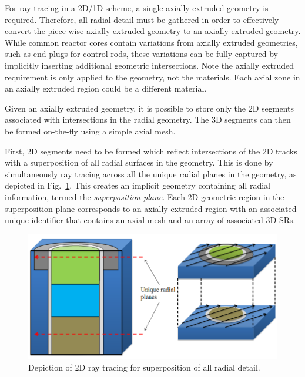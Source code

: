 For ray tracing in a 2D/1D scheme, a single axially extruded geometry is required. Therefore, all radial detail must be gathered in order to effectively convert the piece-wise axially extruded geometry to an axially extruded geometry. While common reactor cores contain variations from axially extruded geometries, such as end plugs for control rods, these variations can be fully captured by implicitly inserting additional geometric intersections. Note the axially extruded requirement is only applied to the geometry, not the materials. Each axial zone in an axially extruded region could be a different material. 

Given an axially extruded geometry, it is possible to store only the 2D segments associated with intersections in the radial geometry. The 3D segments can then be formed on-the-fly using a simple axial mesh.

First, 2D segments need to be formed which reflect intersections of the 2D tracks with a superposition of all radial surfaces in the geometry. This is done by simultaneously ray tracing across all the unique radial planes in the geometry, as depicted in Fig.~\ref{fig:superposition}. This creates an implicit geometry containing all radial information, termed the \textit{superposition plane}. Each 2D geometric region in the superposition plane corresponds to an axially extruded region with an associated unique identifier that contains an axial mesh and an array of associated 3D \ac{SR}s. 

\begin{figure}[ht!]
	\centering
	\includegraphics[width=\linewidth]{figures/ph2016/new_unique_z_levels_v_extruded_rt2.png}
	\caption{Depiction of 2D ray tracing for superposition of all radial detail.}
	\label{fig:superposition}
\end{figure}

